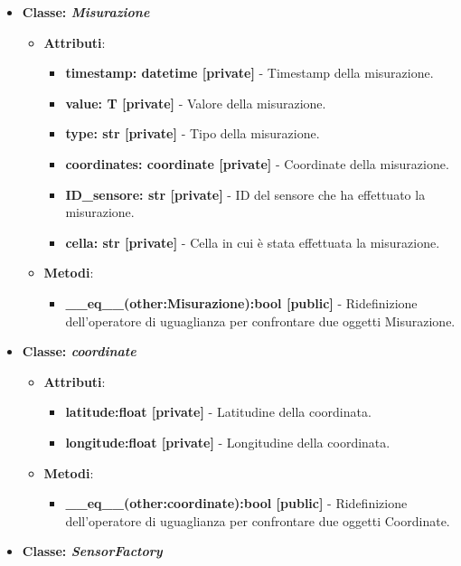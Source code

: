 \begin{itemize}
    \item{\textbf{Classe: \textit{Misurazione}}}
    \begin{itemize}
        \item   \textbf{Attributi}: 
    \begin{itemize}
        \item \textbf{timestamp: datetime [private]} - Timestamp della misurazione.
        \item \textbf{value: T [private]} - Valore della misurazione.
        \item \textbf{type: str [private]} - Tipo della misurazione.
        \item \textbf{coordinates: coordinate [private]} - Coordinate della misurazione.
        \item \textbf{ID\_sensore: str [private]} - ID del sensore che ha effettuato la misurazione.
        \item \textbf{cella: str [private]} - Cella in cui è stata effettuata la misurazione.
    \end{itemize}
    \item   \textbf{Metodi}: 
    \begin{itemize}
        \item \textbf{\_\_eq\_\_(other:Misurazione):bool [public]} - Ridefinizione dell'operatore di uguaglianza per confrontare due oggetti Misurazione.
    \end{itemize}
\end{itemize}
    \item{\textbf{Classe: \textit{coordinate}}}
    \begin{itemize}
        \item    \textbf{Attributi}: 
    \begin{itemize}
        \item \textbf{latitude:float [private]} - Latitudine della coordinata.
        \item \textbf{longitude:float [private]} - Longitudine della coordinata.
    \end{itemize}
    \item     \textbf{Metodi}: 
    \begin{itemize}
        \item \textbf{\_\_eq\_\_(other:coordinate):bool [public]} - Ridefinizione dell'operatore di uguaglianza per confrontare due oggetti Coordinate.
    \end{itemize}
\end{itemize}
    \item{\textbf{Classe: \textit{SensorFactory}}}

\end{itemize}
